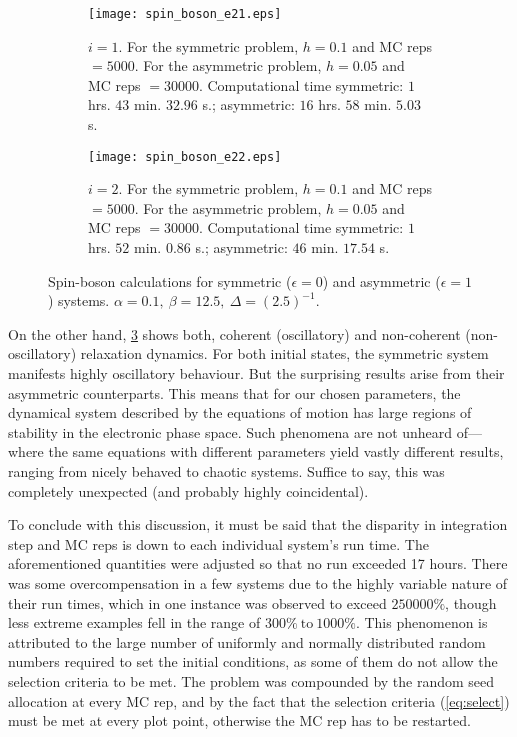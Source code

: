 \begin{figure}
\begin{subfigure}{\textwidth}
\centering
\texttt{[image: spin\_boson\_e21.eps]}
\caption{$ i = 1 $. For the symmetric problem, $ h = 0.1 $ and MC reps $ = 5000 $. For the asymmetric problem, $ h = 0.05 $ and MC reps $ = 30000 $. Computational time symmetric: $ 1 $ hrs. $ 43 $ min. $ 32.96 $ s.; asymmetric: $ 16 $ hrs. $ 58 $ min. $ 5.03 $ s.}
\label{f:sbe21}
\end{subfigure}

\begin{subfigure}{\textwidth}
\centering
\texttt{[image: spin\_boson\_e22.eps]}
\caption{$ i = 2 $. For the symmetric problem, $ h = 0.1 $ and MC reps $ = 5000 $. For the asymmetric problem, $ h = 0.05 $ and MC reps $ = 30000 $. Computational time symmetric: $ 1 $ hrs. $ 52 $ min. $ 0.86 $ s.; asymmetric: $ 46 $ min. $ 17.54 $ s.}
\label{f:sbe22}
\end{subfigure}
\caption{Spin-boson calculations for symmetric ($ \epsilon = 0 $) and asymmetric ($ \epsilon = 1 $) systems. $\alpha = 0.1,~\beta = 12.5,~\Delta = (2.5)^{-1}$.}
\label{f:sb2}
\end{figure}
On the other hand, \cref{f:sb2} shows both, coherent (oscillatory) and non-coherent (non-oscillatory) relaxation dynamics. For both initial states, the symmetric system manifests highly oscillatory behaviour. But the surprising results arise from their asymmetric counterparts. This means that for our chosen parameters, the dynamical system described by the equations of motion has large regions of stability in the electronic phase space. Such phenomena are not unheard of---where the same equations with different parameters yield vastly different results, ranging from nicely behaved to chaotic systems. Suffice to say, this was completely unexpected (and probably highly coincidental).

To conclude with this discussion, it must be said that the disparity in integration step and MC reps is down to each individual system's run time. The aforementioned quantities were adjusted so that no run exceeded 17 hours. There was some overcompensation in a few systems due to the highly variable nature of their run times, which in one instance was observed to exceed $ 250000\% $, though less extreme examples fell in the range of $ 300\%~\text{to}~1000\% $. This phenomenon is attributed to the large number of uniformly and normally distributed random numbers required to set the initial conditions, as some of them do not allow the selection criteria to be met. The problem was compounded by the random seed allocation at every MC rep, and by the fact that the selection criteria (\cref{eq:select}) must be met at every plot point, otherwise the MC rep has to be restarted.
%
